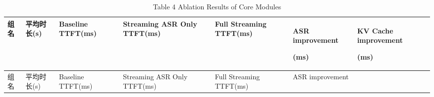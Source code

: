 \documentclass[
]{article}
\begin{document}
\begin{longtable}[]{@{}
  >{\centering\arraybackslash}p{}
  >{\centering\arraybackslash}p{}
  >{\centering\arraybackslash}p{}
  >{\centering\arraybackslash}p{}
  >{\centering\arraybackslash}p{}
  >{\centering\arraybackslash}p{}
  >{\centering\arraybackslash}p{}@{}}
\caption{Table 4 Ablation Results of Core Modules}\tabularnewline
\toprule\noalign{}
\begin{minipage}[b]{\linewidth}\centering
组名
\end{minipage} & \begin{minipage}[b]{\linewidth}\centering
平均时长(s)
\end{minipage} & \begin{minipage}[b]{\linewidth}\centering
Baseline TTFT(ms)
\end{minipage} & \begin{minipage}[b]{\linewidth}\centering
Streaming ASR Only TTFT(ms)
\end{minipage} & \begin{minipage}[b]{\linewidth}\centering
Full Streaming TTFT(ms)
\end{minipage} & \begin{minipage}[b]{\linewidth}\centering
ASR improvement

(ms)
\end{minipage} & \begin{minipage}[b]{\linewidth}\centering
KV Cache improvement

(ms)
\end{minipage} \\
\midrule\noalign{}
\endfirsthead
\toprule\noalign{}
\begin{minipage}[b]{\linewidth}\centering
组名
\end{minipage} & \begin{minipage}[b]{\linewidth}\centering
平均时长(s)
\end{minipage} & \begin{minipage}[b]{\linewidth}\centering
Baseline TTFT(ms)
\end{minipage} & \begin{minipage}[b]{\linewidth}\centering
Streaming ASR Only TTFT(ms)
\end{minipage} & \begin{minipage}[b]{\linewidth}\centering
Full Streaming TTFT(ms)
\end{minipage} & \begin{minipage}[b]{\linewidth}\centering
ASR improvement


\end{minipage}
\end{longtable}
\end{document}
